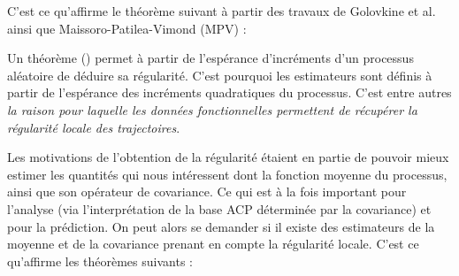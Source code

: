 
C'est ce qu'affirme le théorème suivant à partir des travaux de Golovkine et al. ainsi que Maissoro-Patilea-Vimond (MPV) :

\begin{thm*}
    \noindent{}
    \label{thm*:regularite_locale}
\end{thm*}
\begin{rem}
    Un théorème () permet à partir de l'espérance d'incréments d'un processus aléatoire de déduire sa régularité.
    C'est pourquoi les estimateurs sont définis à partir de l'espérance des incréments quadratiques du processus. C'est entre autres \emph{la raison pour laquelle les données fonctionnelles permettent de récupérer la régularité locale des trajectoires}.

    \label{rem:kolmo_continuite}
\end{rem}

Les motivations de l'obtention de la régularité étaient en partie de pouvoir mieux estimer les quantités qui nous intéressent dont la fonction moyenne du processus, ainsi que son opérateur de covariance. Ce qui est à la fois important pour l'analyse (via l'interprétation de la base ACP déterminée par la covariance) et pour la prédiction. On peut alors se demander si il existe des estimateurs de la moyenne et de la covariance prenant en compte la régularité locale. C'est ce qu'affirme les théorèmes suivants :


\begin{thm*}
    \noindent{}

    \label{thm*:estimation_adaptative}
\end{thm*}

